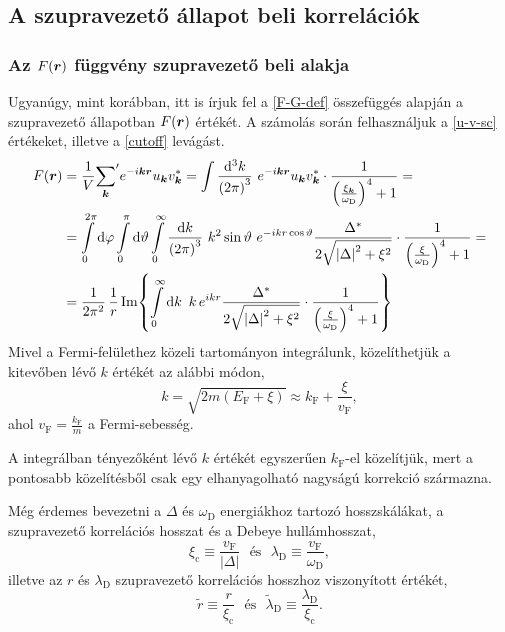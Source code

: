 \documentclass[a4paper,12pt,titlepage]{article}
\newcommand{\KK}{{\vb*{k}}}
\newcommand{\RR}{{\vb*{r}}}
\newcommand{\kF}{{k_\text{F}}}
\newcommand{\EF}{{E_\text{F}}}
\newcommand{\vF}{{v_\text{F}}}
\begin{document}
\subsection{A szupravezető állapot beli korrelációk}

\subsubsection{Az $F(\RR)$ függvény szupravezető beli alakja}

Ugyanúgy, mint korábban, itt is írjuk fel a \eqref{F-G-def} összefüggés alapján a szupravezető állapotban $F(\RR)$ értékét.  A számolás során felhasználjuk a \eqref{u-v-sc} értékeket, illetve a \eqref{cutoff} levágást.
\begin{equation}
\begin{split}
	F(\RR) & = \frac{1}{V} {\sum\limits_\KK}^\prime e^{-i \KK \RR} u_\KK v_\KK^* = \int \frac{\dd[3]k}{\left( 2 \pi \right)^3} ~ e^{-i \KK \RR} u_\KK v_\KK^* \cdot \frac{1}{\left( \frac{\xi_\KK}{\omega_\text{D}} \right)^4 + 1} = \\
	& = \int\limits_0^{2 \pi} \dd{\varphi} \int\limits_0^\pi \dd{\vartheta} \int\limits_0^\infty \frac{\dd{k}}{\left( 2 \pi \right)^3} ~ k^2 \sin\vartheta ~ e^{-i k r \cos\vartheta} \frac{\Delta^*}{2 \sqrt{\left| \Delta \right|^2 + \xi^2}} \cdot \frac{1}{\left( \frac{\xi}{\omega_\text{D}} \right)^4 + 1} = \\
	& = \frac{1}{2 \pi^2} \, \frac{1}{r} \Im{ \int\limits_0^\infty \dd{k} ~ k \, e^{i k r} \frac{\Delta^*}{2 \sqrt{\left| \Delta \right|^2 + \xi^2}} \cdot \frac{1}{\left( \frac{\xi}{\omega_\text{D}} \right)^4 + 1} }
\end{split}
\end{equation}
Mivel a Fermi-felülethez közeli tartományon integrálunk, közelíthetjük a kitevőben lévő $k$ értékét az alábbi módon,
\begin{equation} \label{k-xi-approx}
	k = \sqrt{2 m \left( \EF + \xi \right)} \approx \kF + \frac{\xi}{\vF},
\end{equation}
ahol $\vF = \frac{\kF}{m}$ a Fermi-sebesség.

A integrálban tényezőként lévő $k$ értékét egyszerűen $\kF$-el közelítjük, mert a pontosabb közelítésből csak egy elhanyagolható nagyságú korrekció származna.

Még érdemes bevezetni a $\Delta$ és $\omega_\text{D}$ energiákhoz tartozó hosszskálákat, a szupravezető korrelációs hosszat és a Debeye hullámhosszat,
\begin{equation}
	\xi_\text{c} \equiv \frac{\vF}{\left| \Delta \right|} ~~~ \text{és} ~~~ \lambda_\text{D} \equiv \frac{\vF}{\omega_\text{D}},
\end{equation}
illetve az $r$ és $\lambda_\text{D}$ szupravezető korrelációs hosszhoz viszonyított értékét,
\begin{equation}
	\tilde{r} \equiv \frac{r}{\xi_\text{c}} ~~~ \text{és} ~~~ \tilde{\lambda}_\text{D} \equiv \frac{\lambda_\text{D}}{\xi_\text{c}}.
\end{equation}
\end{document}
